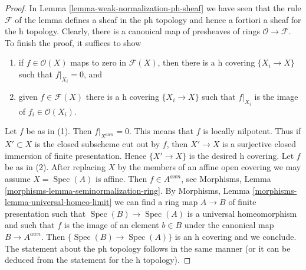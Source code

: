 \documentclass[10pt,a4paper]{amsart}
\theoremstyle{plain}
\theoremstyle{definition}
\theoremstyle{remark}
\numberwithin{equation}{subsection}
\def\Spec{\mathop{\mathrm{Spec}}}
\begin{document}
\begin{proof}
In Lemma \ref{lemma-weak-normalization-ph-sheaf}
we have seen that the rule $\mathcal{F}$ of the lemma
defines a sheaf in the ph topology and hence a fortiori
a sheaf for the h topology. Clearly, there is a canonical map
of presheaves of rings $\mathcal{O} \to \mathcal{F}$.
To finish the proof, it suffices to show
\begin{enumerate}
\item if $f \in \mathcal{O}(X)$ maps to zero in $\mathcal{F}(X)$,
then there is a h covering $\{X_i \to X\}$ such that $f|_{X_i} = 0$, and
\item given $f \in \mathcal{F}(X)$ there is a h covering
$\{X_i \to X\}$ such that $f|_{X_i}$ is the image of $f_i \in \mathcal{O}(X_i)$.
\end{enumerate}
Let $f$ be as in (1). Then $f|_{X^{awn}} = 0$. This means that $f$
is locally nilpotent. Thus if $X' \subset X$ is the closed subscheme
cut out by $f$, then $X' \to X$ is a surjective closed immersion of
finite presentation. Hence $\{X' \to X\}$ is the desired h covering.
Let $f$ be as in (2). After replacing $X$ by the members of an
affine open covering we may assume $X = \Spec(A)$ is affine.
Then $f \in A^{awn}$, see
Morphisms, Lemma \ref{morphisms-lemma-seminormalization-ring}.
By Morphisms, Lemma \ref{morphisms-lemma-universal-homeo-limit}
we can find a ring map $A \to B$ of finite presentation
such that $\Spec(B) \to \Spec(A)$ is a universal homeomorphism
and such that $f$ is the image of an element $b \in B$ under
the canonical map $B \to A^{awn}$. Then
$\{\Spec(B) \to \Spec(A)\}$ is an h covering and we conclude.
The statement about the ph topology follows in the same manner
(or it can be deduced from the statement for the h topology).
\end{proof}
\end{document}
